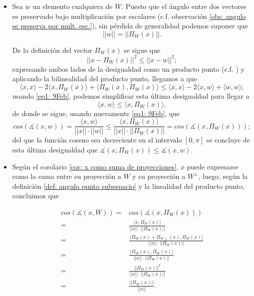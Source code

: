 \begin{itemize}
\item  Sea $w$ un elemento cualquiera de $W$.
Puesto que el ángulo entre dos vectores es
preservado bajo multiplicación por escalares
(c.f. observación
\ref{obs: angulo se preserva por mult. esc.}), sin pérdida de generalidad
podemos suponer que 
\begin{equation}
\label{eq1: 9Feb}
||w||= || \Pi_{W}(x)||.
\end{equation}

De la definición del vector $\Pi_{W}(x)$ se sigue que
\[
|| x -\Pi_{W}(x) ||^{2} \leq  || x - w||^{2};
\]
expresando ambos lados de la desigualdad como un producto
punto (c.f. ) y aplicando la
bilinealidad del producto punto, llegamos a que
\[
\langle x , x \rangle -2 \langle x, \Pi_{W}(x) \rangle +
\langle \Pi_{W}(x) , \Pi_{W}(x) \rangle \leq 
\langle x , x \rangle  -2 \langle x , w \rangle 
+ \langle w , w \rangle ;
\]
usando \eqref{eq1: 9Feb}, podemos simplificar esta
última desigualdad para llegar a 
\[
\langle x, w \rangle \leq \langle x, \Pi_{W}(x) \rangle,
\]
de donde se sigue, usando nuevamente \eqref{eq1: 9Feb},
que 
\[
cos \left( \measuredangle (x,w) \right) =
\frac{\langle x , w \rangle}{||x||\cdot ||w||} \leq
\frac{\langle x ,  \Pi_{W}(x)  \rangle}{||x||\cdot ||\Pi_{W}(x) ||} =
cos \left( \measuredangle \left(x, \Pi_{W}(x) \right) \right);
\]
del que la función coseno sea decreciente en el intervalo
$[0, \pi]$ se concluye de esta última desigualdad que
$ \measuredangle \left(x, \Pi_{W}(x) \right) \leq 
\measuredangle (x,w)$.

\item Según el corolario 
\ref{cor: x como suma de proyecciones}, 
$x$ puede expresarse como la suma entre su proyección
a $W$ y su proyección a $W^{\perp}$, luego,
según la definición \ref{def: angulo punto subespacio}
y la linealidad del producto punto, concluimos que

\begin{align*}
cos \left( \measuredangle (x, W) \right) = &
cos \left( \measuredangle (x, \Pi_{W}(x)) \right)  \\
= & 
\frac{\langle x , \Pi_{W}(x) \rangle}{||x|| \cdot || \Pi_{W}(x)||}  \\
= & 
\frac{\langle \Pi_{W}(x)+\Pi_{W\perp}(x) , \Pi_{W}(x) \rangle}{||x|| \cdot || \Pi_{W}(x)||}\\
= & \frac{\langle \Pi_{W}(x) , \Pi_{W}(x) \rangle}{||x|| \cdot || \Pi_{W}(x)||}\\
= & \frac{|| \Pi_{W}(x) ||^{2}}{||x|| \cdot || \Pi_{W}(x)||}\\
= & \frac{|| \Pi_{W}(x) ||}{||x||}.
\end{align*}
\end{itemize}

